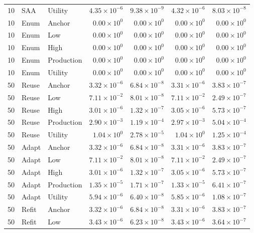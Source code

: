 \begin{longtable}{rllrrrr}
10 & SAA & Utility & $4.35\times10^{-6}$ & $9.38\times10^{-9}$ & $4.32\times10^{-6}$ & $8.03\times10^{-8}$\\
10 & Enum & Anchor & $0.00\times10^{0}$ & $0.00\times10^{0}$ & $0.00\times10^{0}$ & $0.00\times10^{0}$\\
10 & Enum & Low & $0.00\times10^{0}$ & $0.00\times10^{0}$ & $0.00\times10^{0}$ & $0.00\times10^{0}$\\
10 & Enum & High & $0.00\times10^{0}$ & $0.00\times10^{0}$ & $0.00\times10^{0}$ & $0.00\times10^{0}$\\
10 & Enum & Production & $0.00\times10^{0}$ & $0.00\times10^{0}$ & $0.00\times10^{0}$ & $0.00\times10^{0}$\\
10 & Enum & Utility & $0.00\times10^{0}$ & $0.00\times10^{0}$ & $0.00\times10^{0}$ & $0.00\times10^{0}$\\
50 & Reuse & Anchor & $3.32\times10^{-6}$ & $6.84\times10^{-8}$ & $3.31\times10^{-6}$ & $3.83\times10^{-7}$\\
50 & Reuse & Low & $7.11\times10^{-2}$ & $8.01\times10^{-8}$ & $7.11\times10^{-2}$ & $2.49\times10^{-7}$\\
50 & Reuse & High & $3.01\times10^{-6}$ & $1.32\times10^{-7}$ & $3.05\times10^{-6}$ & $5.73\times10^{-7}$\\
50 & Reuse & Production & $2.90\times10^{-3}$ & $1.19\times10^{-4}$ & $2.97\times10^{-3}$ & $5.04\times10^{-4}$\\
50 & Reuse & Utility & $1.04\times10^{0}$ & $2.78\times10^{-5}$ & $1.04\times10^{0}$ & $1.25\times10^{-4}$\\
50 & Adapt & Anchor & $3.32\times10^{-6}$ & $6.84\times10^{-8}$ & $3.31\times10^{-6}$ & $3.83\times10^{-7}$\\
50 & Adapt & Low & $7.11\times10^{-2}$ & $8.01\times10^{-8}$ & $7.11\times10^{-2}$ & $2.49\times10^{-7}$\\
50 & Adapt & High & $3.01\times10^{-6}$ & $1.32\times10^{-7}$ & $3.05\times10^{-6}$ & $5.73\times10^{-7}$\\
50 & Adapt & Production & $1.35\times10^{-5}$ & $1.71\times10^{-7}$ & $1.33\times10^{-5}$ & $6.41\times10^{-7}$\\
50 & Adapt & Utility & $5.94\times10^{-6}$ & $6.40\times10^{-8}$ & $5.85\times10^{-6}$ & $1.08\times10^{-7}$\\
50 & Refit & Anchor & $3.32\times10^{-6}$ & $6.84\times10^{-8}$ & $3.31\times10^{-6}$ & $3.83\times10^{-7}$\\
50 & Refit & Low & $3.43\times10^{-6}$ & $6.23\times10^{-8}$ & $3.43\times10^{-6}$ & $3.64\times10^{-7}$\\

\end{longtable}
